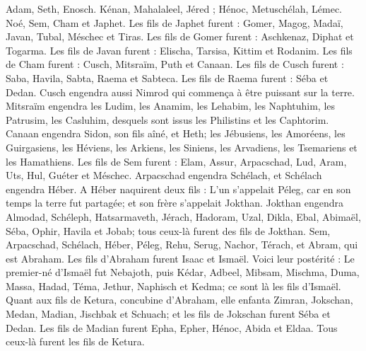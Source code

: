 \begin{multicols}{2}
\VerseOne{}Adam, Seth, Enosch.
Kénan, Mahalaleel, Jéred ;
Hénoc, Metuschélah, Lémec.
Noé, Sem, Cham et Japhet.
Les fils de Japhet furent : Gomer, Magog, Madaï, Javan, Tubal, Méschec et Tiras.
Les fils de Gomer furent : Aschkenaz, Diphat et Togarma.
Les fils de Javan furent : Elischa, Tarsisa, Kittim et Rodanim.
Les fils de Cham furent : Cusch, Mitsraïm, Puth et Canaan.
Les fils de Cusch furent : Saba, Havila, Sabta, Raema et Sabteca. Les fils de Raema furent : Séba et Dedan.
Cusch engendra aussi Nimrod qui commença à être puissant sur la terre.
Mitsraïm engendra les Ludim, les Anamim, les Lehabim, les Naphtuhim,
les Patrusim, les Casluhim, desquels sont issus les Philistins et les Caphtorim.
Canaan engendra Sidon, son fils aîné, et Heth;
les Jébusiens, les Amoréens, les Guirgasiens,
les Héviens, les Arkiens, les Siniens,
les Arvadiens, les Tsemariens et les Hamathiens.
Les fils de Sem furent : Elam, Assur, Arpacschad, Lud, Aram, Uts, Hul, Guéter et Méschec.
Arpacschad engendra Schélach, et Schélach engendra Héber.
A Héber naquirent deux fils : L'un s'appelait Péleg, car en son temps la terre fut partagée; et son frère s'appelait Jokthan.
Jokthan engendra Almodad, Schéleph, Hatsarmaveth, Jérach,
Hadoram, Uzal, Dikla,
Ebal, Abimaël, Séba,
Ophir, Havila et Jobab; tous ceux-là furent des fils de Jokthan.
Sem, Arpacschad, Schélach,
Héber, Péleg, Rehu,
Serug, Nachor, Térach,
et Abram, qui est Abraham.
Les fils d'Abraham furent Isaac et Ismaël.
Voici leur postérité : Le premier-né d'Ismaël fut Nebajoth, puis Kédar, Adbeel, Mibsam,
Mischma, Duma, Massa, Hadad, Téma,
Jethur, Naphisch et Kedma; ce sont là les fils d'Ismaël.
Quant aux fils de Ketura, concubine d'Abraham, elle enfanta Zimran, Jokschan, Medan, Madian, Jischbak et Schuach; et les fils de Jokschan furent Séba et Dedan.
Les fils de Madian furent Epha, Epher, Hénoc, Abida et Eldaa. Tous ceux-là furent les fils de Ketura.

\end{multicols}
